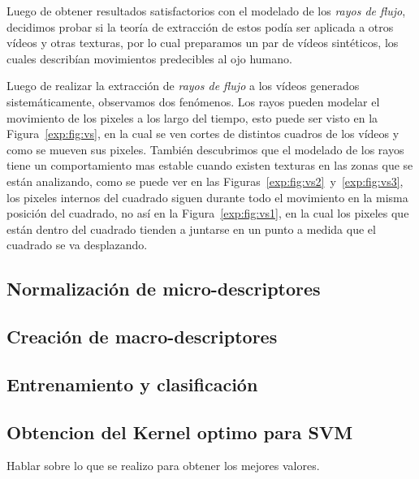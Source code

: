 Luego de obtener resultados satisfactorios con el modelado de los \textit{rayos de flujo}, decidimos probar si la teoría de extracción de estos podía ser aplicada a otros vídeos y otras texturas, por lo cual preparamos un par de vídeos sintéticos, los cuales describían movimientos predecibles al ojo humano.

Luego de realizar la extracción de \textit{rayos de flujo} a los vídeos generados sistemáticamente, observamos dos fenómenos. Los rayos pueden modelar el movimiento de los pixeles a los largo del tiempo, esto puede ser visto en la Figura~\ref{exp:fig:vs}, en la cual se ven cortes de distintos cuadros de los vídeos y como se mueven sus pixeles. También descubrimos que el modelado de los rayos tiene un comportamiento mas estable cuando existen texturas en las zonas que se están analizando, como se puede ver en las Figuras~\ref{exp:fig:vs2}~y~\ref{exp:fig:vs3}, los pixeles internos del cuadrado siguen durante todo el movimiento en la misma posición del cuadrado, no así en la Figura~\ref{exp:fig:vs1}, en la cual los pixeles que están dentro del cuadrado tienden a juntarse en un punto a medida que el cuadrado se va desplazando.


\subsection{ Normalización de micro-descriptores}


\subsection{ Creación de macro-descriptores}


\subsection{ Entrenamiento y clasificación}




\subsection{Obtencion del Kernel optimo para SVM}

Hablar sobre lo que se realizo para obtener los mejores valores.

